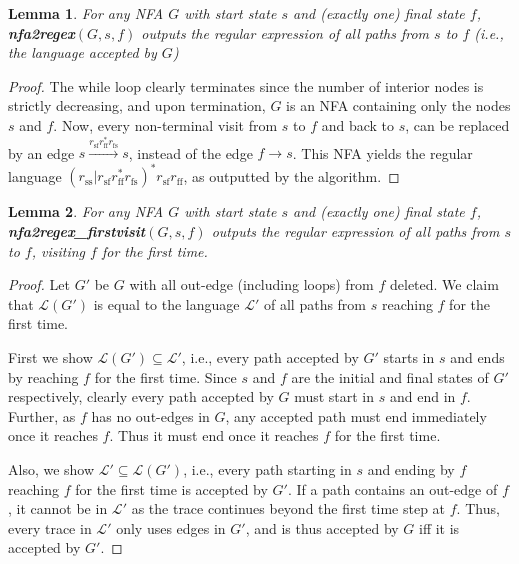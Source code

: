 \documentclass[conference]{IEEEtran}
\newtheorem{lemma}{Lemma}[section]
\theoremstyle{definition}
\theoremstyle{remark}
\renewcommand{\L}{\mathscr{L}}
\begin{document}
\begin{lemma}
    For any NFA $G$ with start state $s$ and (exactly one) final state $f$, \textbf{nfa2regex}$(G, s, f)$ outputs the regular expression of all paths from $s$ to $f$ (i.e., the language accepted by $G$)
\end{lemma}
\begin{proof}
    The while loop clearly terminates since the number of interior nodes is strictly decreasing, and upon termination, $G$ is an NFA containing only the nodes $s$ and $f$. Now, every non-terminal visit from $s$ to $f$ and back to $s$, can be replaced by an edge $s\xrightarrow{r_\mathrm{sf}r_\mathrm{ff}^* r_\mathrm{fs}} s$, instead of the edge $f\to s$. This NFA yields the regular language $(r_\mathrm{ss}|r_\mathrm{sf}r_\mathrm{ff}^* r_\mathrm{fs})^* r_\mathrm{sf} r_\mathrm{ff}$, as outputted by the algorithm.
\end{proof}

\begin{lemma}
    For any NFA $G$ with start state $s$ and (exactly one) final state $f$, \textbf{nfa2regex\_firstvisit}$(G, s, f)$ outputs the regular expression of all paths from $s$ to $f$, visiting $f$ for the first time.
\end{lemma}
\begin{proof}
    Let $G'$ be $G$ with all out-edge (including loops) from $f$ deleted. We claim that $\L(G')$ is equal to the language $\L'$ of all paths from $s$ reaching $f$ for the first time.

    First we show $\L(G') \subseteq \L'$, i.e., every path accepted by $G'$ starts in $s$ and ends by reaching $f$ for the first time. Since $s$ and $f$ are the initial and final states of $G'$ respectively, clearly every path accepted by $G$ must start in $s$ and end in $f$. Further, as $f$ has no out-edges in $G$, any accepted path must end immediately once it reaches $f$. Thus it must end once it reaches $f$ for the first time.

    Also, we show $\L' \subseteq \L(G')$, i.e., every path starting in $s$ and ending by $f$ reaching $f$ for the first time is accepted by $G'$. If a path contains an out-edge of $f$, it cannot be in $\L'$ as the trace continues beyond the first time step at $f$. Thus, every trace in $\L'$ only uses edges in $G'$, and is thus accepted by $G$ iff it is accepted by $G'$.
\end{proof}
\end{document}
